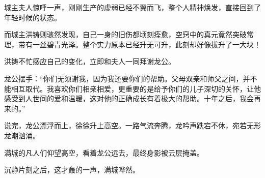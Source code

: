 \begin{this_body}
城主夫人惊呼一声，刚刚生产的虚弱已经不翼而飞，整个人精神焕发，直接回到了年轻时候的状态。

而城主洪铸则骇然发现，自己一身的旧伤都顷刻痊愈，空窍中的真元竟然突破常理，带有一丝碧青光泽。整个实力原本已经升无可升，此刻却好像拔升了一大块！

洪铸不忙感应自己的变化，立即和夫人一同拜谢龙公。

龙公摆手：“你们无须谢我，因为我还要你们的帮助。父母双亲和师父之间，并不能相互取代。我喜欢你们相亲相爱，更重要的是给予你们的儿子深切的关怀，让他感受到人世间的爱和温暖，这对他的正确成长有着极大的帮助。十年之后，我会再来的。”

说完，龙公漂浮而上，徐徐升上高空。一路气流奔腾，龙吟声跌宕不休，宛若无形龙潮汹涌。

满城的凡人们仰望高空，看着龙公远去，最终身影被云层掩盖。

沉静片刻之后，这才轰的一声，满城哗然。

\end{this_body}

